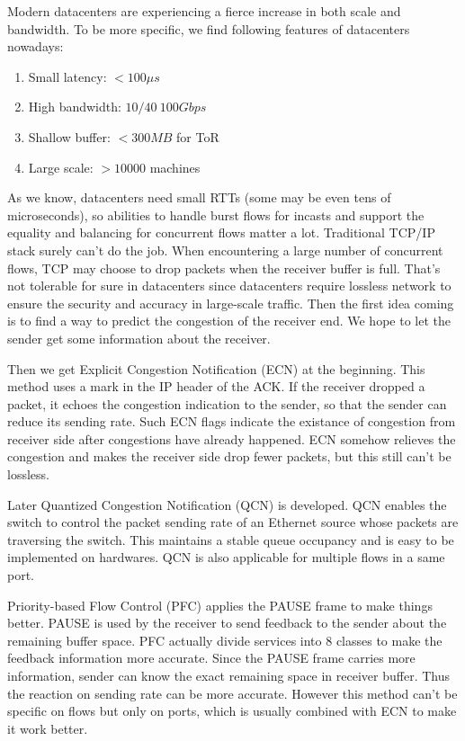 \documentclass[12pt,a4paper]{article}
\begin{document}
Modern datacenters are experiencing a fierce increase in both scale and bandwidth.
To be more specific, we find following features of datacenters nowadays:
\begin{enumerate}
	\item Small latency: $<100\mu s$
	\item High bandwidth: $10/40~100Gbps$
	\item Shallow buffer: $<300MB$ for ToR
	\item Large scale: $>10000$ machines
\end{enumerate}
As we know, datacenters need small RTTs (some may be even tens of microseconds),
so abilities to handle burst flows for incasts and support the equality and balancing for concurrent flows matter a lot.
Traditional TCP/IP stack surely can't do the job.
When encountering a large number of concurrent flows, TCP may choose to drop packets when the receiver buffer is full.
That's not tolerable for sure in datacenters since datacenters require lossless network to ensure the security and accuracy in large-scale traffic.
Then the first idea coming is to find a way to predict the congestion of the receiver end.
We hope to let the sender get some information about the receiver.

Then we get Explicit Congestion Notification (ECN) \cite{ECN} at the beginning.
This method uses a mark in the IP header of the ACK.
If the receiver dropped a packet, it echoes the congestion indication to the sender, so that the sender can reduce its sending rate.
Such ECN flags indicate the existance of congestion from receiver side after congestions have already happened.
ECN somehow relieves the congestion and makes the receiver side drop fewer packets, but this still can't be lossless.

Later Quantized Congestion Notification (QCN) \cite{QCN} is developed.
QCN enables the switch to control the packet sending rate of an Ethernet source whose packets are traversing the switch.
This maintains a stable queue occupancy and is easy to be implemented on hardwares.
QCN is also applicable for multiple flows in a same port.

Priority-based Flow Control (PFC) \cite{PFC} applies the PAUSE frame to make things better.
PAUSE is used by the receiver to send feedback to the sender about the remaining buffer space.
PFC actually divide services into 8 classes to make the feedback information more accurate.
Since the PAUSE frame carries more information, sender can know the exact remaining space in receiver buffer.
Thus the reaction on sending rate can be more accurate.
However this method can't be specific on flows but only on ports, which is usually combined with ECN to make it work better.
\end{document}

